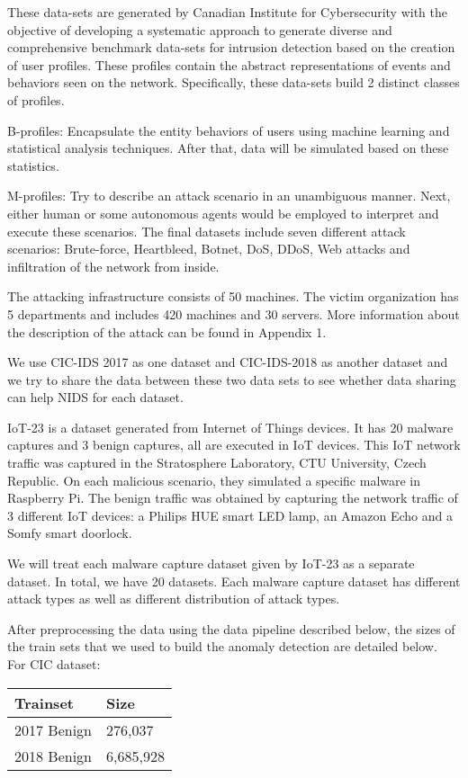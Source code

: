 \begin{background}
These data-sets are generated by Canadian Institute for Cybersecurity with the objective of developing a systematic approach to generate diverse and comprehensive benchmark data-sets for intrusion detection based on the creation of user profiles. These profiles contain the abstract representations of events and behaviors seen on the network. Specifically, these data-sets build 2 distinct classes of profiles. 

B-profiles: Encapsulate the entity behaviors of users using machine learning and statistical analysis  techniques. After that, data will be simulated based on these statistics.

M-profiles: Try to describe an attack scenario in an unambiguous manner. Next, either human or some autonomous agents would be employed to interpret and execute these scenarios. The final datasets include seven different attack scenarios: Brute-force, Heartbleed, Botnet, DoS, DDoS, Web attacks and infiltration of the network from inside. 

The attacking infrastructure consists of 50 machines. The victim organization has 5 departments and includes 420 machines and 30 servers. More information about the description of the attack can be found in Appendix 1.

We use CIC-IDS 2017 as one dataset and CIC-IDS-2018 as another dataset and we try to share the data between these two data sets to see whether data sharing can help NIDS for each dataset.

IoT-23 is a dataset generated from Internet of Things devices. It has 20 malware captures and 3 benign captures, all are executed in IoT devices. This IoT network traffic was captured in the Stratosphere Laboratory, CTU University, Czech Republic. On each malicious scenario, they simulated a specific malware in Raspberry Pi. The benign traffic was obtained by capturing the network traffic of 3 different IoT devices: a Philips HUE smart LED lamp, an Amazon Echo and a Somfy smart doorlock.

We will treat each malware capture dataset given by IoT-23 as a separate dataset. In total, we have 20 datasets. Each malware capture dataset has different attack types as well as different distribution of attack types.

After preprocessing the data using the data pipeline described below, the sizes of the train sets that we used to build the anomaly detection are detailed below.\\
For CIC dataset:
\begin{table}[!ht]
    \centering
    \begin{tabular}{|l|l|}
    \hline
        Trainset & Size \\ \hline
        2017 Benign & 276,037 \\ \hline
        2018 Benign & 6,685,928 \\ \hline
    \end{tabular}
\end{table}


\end{background}
